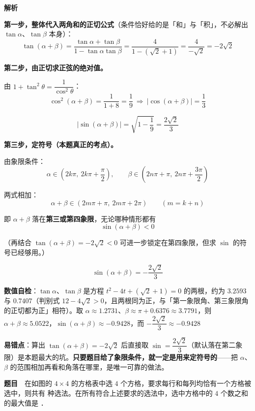\textbf{解析}

\textbf{第一步，整体代入两角和的正切公式}（条件恰好给的是「和」与「积」，不必解出 $\tan\alpha$、$\tan\beta$ 本身）：
\[\tan(\alpha+\beta)=\frac{\tan\alpha+\tan\beta}{1-\tan\alpha\tan\beta}=\frac4{1-\left(\sqrt2+1\right)}=\frac4{-\sqrt2}=-2\sqrt2\]

\textbf{第二步，由正切求正弦的绝对值。}

由 $1+\tan^{2}\theta=\dfrac1{\cos^{2}\theta}$：
\[\cos^{2}(\alpha+\beta)=\frac1{1+8}=\frac19\ \Longrightarrow\ |\cos(\alpha+\beta)|=\frac13\]

\[|\sin(\alpha+\beta)|=\sqrt{1-\frac19}=\frac{2\sqrt2}3\]

\textbf{第三步，定符号（本题真正的考点）。}

由象限条件：
\[\alpha\in\left(2k\pi,\ 2k\pi+\frac\pi2\right),\qquad \beta\in\left(2n\pi+\pi,\ 2n\pi+\frac{3\pi}2\right)\]

两式相加：
\[\alpha+\beta\in\left(2m\pi+\pi,\ 2m\pi+2\pi\right)\qquad(m=k+n)\]

即 $\alpha+\beta$ 落在\textbf{第三或第四象限}，无论哪种情形都有
\[\sin(\alpha+\beta)<0\]

（再结合 $\tan(\alpha+\beta)=-2\sqrt2<0$ 可进一步锁定在第四象限，但求 $\sin$ 的符号已经够用。）

\[\sin(\alpha+\beta)=-\frac{2\sqrt2}3\]


\begin{gktip}
\textbf{数值自检}：$\tan\alpha$、$\tan\beta$ 是方程 $t^{2}-4t+\left(\sqrt2+1\right)=0$ 的两根，约为 $3.2593$ 与 $0.7407$（判别式 $12-4\sqrt2>0$，且两根同为正，与「第一象限角、第三象限角的正切都为正」相符）。取 $\alpha\approx1.2731$、$\beta\approx\pi+0.6376\approx3.7791$，则 $\alpha+\beta\approx5.0522$，$\sin(\alpha+\beta)\approx-0.9428$，而 $-\dfrac{2\sqrt2}3\approx-0.9428$ 

\textbf{易错点}：算出 $\tan(\alpha+\beta)=-2\sqrt2$ 后直接取 $\sin=\dfrac{2\sqrt2}3$（默认落在第二象限）是本题最大的坑。\textbf{只要题目给了象限条件，就一定是用来定符号的}——把 $\alpha$、$\beta$ 的范围相加再看和角落在哪里，是唯一可靠的做法。
\end{gktip}

\par\medskip


\textbf{题目}　在如图的 $4\times4$ 的方格表中选 $4$ 个方格，要求每行和每列均恰有一个方格被选中，则共有 \gkblank{} 种选法。在所有符合上述要求的选法中，选中方格中的 $4$ 个数之和的最大值是 \gkblank{}．

